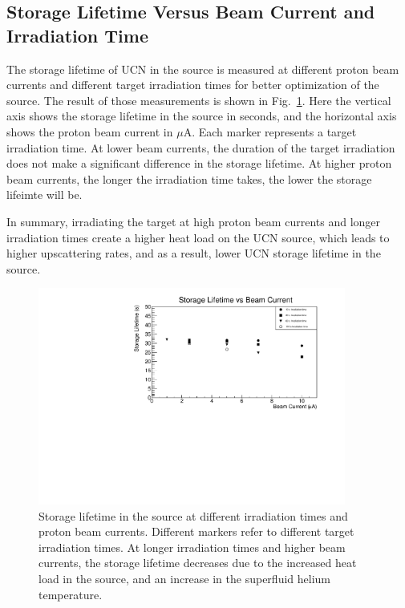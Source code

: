 \subsection{Storage Lifetime Versus Beam Current and Irradiation Time}
The storage lifetime of UCN in the source is measured at different
proton beam currents and different target irradiation times for better
optimization of the source. The result of those measurements is shown
in Fig.~\ref{fig:storage_beam_irrad}. Here the vertical axis shows the
storage lifetime in the source in seconds, and the horizontal axis
shows the proton beam current in $\mu$A. Each marker represents a
target irradiation time. At lower beam currents, the duration of the
target irradiation does not make a significant difference in the
storage lifetime. At higher proton beam currents, the longer the
irradiation time takes, the lower the storage lifeimte will be.

In summary, irradiating the target at high proton beam currents and
longer irradiation times create a higher heat load on the UCN source,
which leads to higher upscattering rates, and as a result, lower UCN
storage lifetime in the source.

\begin{figure}[h!]
  \centering
  \includegraphics[width=0.9\textwidth]{StorageLifetime_17009_and_17009A.pdf}
  \caption[UCN storage lifetime at different irradiation times and
  proton beam currents]{Storage lifetime in the source at different
    irradiation times and proton beam currents. Different markers
    refer to different target irradiation times. At longer irradiation
    times and higher beam currents, the storage lifetime decreases due
    to the increased heat load in the source, and an increase in the
    superfluid helium temperature. }
  \label{fig:storage_beam_irrad}
\end{figure}


